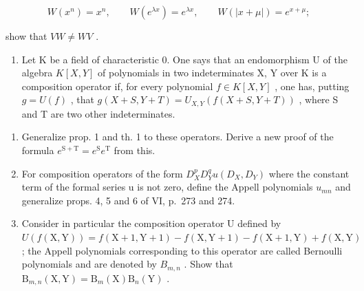 \[
W (x ^ {n}) = x ^ {n}, \qquad W (e ^ {\lambda x}) = e ^ {\lambda x}, \qquad W (| x + \mu |) = e ^ {x + \mu};
\]

show that \(VW \neq WV\) .

\begin{enumerate}
\def\labelenumi{\arabic{enumi})}
\setcounter{enumi}{2}
\tightlist
\item
  Let K be a field of characteristic 0. One says that an endomorphism U of the algebra \(K[X,Y]\) of polynomials in two indeterminates X, Y over K is a composition operator if, for every polynomial \(f \in K[X,Y]\) , one has, putting \(g = U(f)\) , that \(g(X + S, Y + T) = U_{X,Y}(f(X + S, Y + T))\) , where S and T are two other indeterminates.
\end{enumerate}

\begin{enumerate}
\def\labelenumi{\alph{enumi})}
\item
  Generalize prop. 1 and th. 1 to these operators. Derive a new proof of the formula \(e^{\mathrm{S + T}} = e^{\mathrm{S}}e^{\mathrm{T}}\) from this.
\item
  For composition operators of the form \(D_{X}^{p}D_{Y}^{q}u(D_{X},D_{Y})\) where the constant term of the formal series u is not zero, define the Appell polynomials \(u_{mn}\) and generalize props. 4, 5 and 6 of VI, p.~273 and 274.
\item
  Consider in particular the composition operator U defined by \(U(f(\mathrm{X},\mathrm{Y})) = f(\mathrm{X} + 1, \mathrm{Y} + 1) - f(\mathrm{X},\mathrm{Y} + 1) - f(\mathrm{X} + 1, \mathrm{Y}) + f(\mathrm{X},\mathrm{Y})\) ; the Appell polynomials corresponding to this operator are called Bernoulli polynomials and are denoted by \(B_{m,n}\) . Show that \(\mathrm{B}_{m,n}(\mathrm{X},\mathrm{Y}) = \mathrm{B}_{m}(\mathrm{X})\mathrm{B}_{n}(\mathrm{Y})\) .
\end{enumerate}

\setcounter{exercisegroup}{1}
